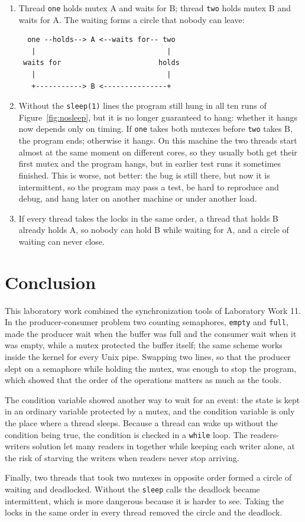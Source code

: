 \documentclass[12pt,a4paper]{article}
\begin{document}
\begin{enumerate}
  \item Thread \texttt{one} holds mutex A and waits for B; thread \texttt{two} holds mutex B and waits for A. The waiting forms a circle that nobody can leave:
\begin{lstlisting}
  one --holds--> A <--waits for-- two
   |                               |
 waits for                       holds
   |                               |
   +-----------> B <---------------+
\end{lstlisting}
  \item Without the \texttt{sleep(1)} lines the program still hung in all ten runs of Figure~\ref{fig:nosleep}, but it is no longer guaranteed to hang: whether it hangs now depends only on timing. If \texttt{one} takes both mutexes before \texttt{two} takes B, the program ends; otherwise it hangs. On this machine the two threads start almost at the same moment on different cores, so they usually both get their first mutex and the program hangs, but in earlier test runs it sometimes finished. This is worse, not better: the bug is still there, but now it is intermittent, so the program may pass a test, be hard to reproduce and debug, and hang later on another machine or under another load.
  \item If every thread takes the locks in the same order, a thread that holds B already holds A, so nobody can hold B while waiting for A, and a circle of waiting can never close.
\end{enumerate}

\newpage
\section*{Conclusion}

This laboratory work combined the synchronization tools of Laboratory Work 11. In the producer-consumer problem two counting semaphores, \texttt{empty} and \texttt{full}, made the producer wait when the buffer was full and the consumer wait when it was empty, while a mutex protected the buffer itself; the same scheme works inside the kernel for every Unix pipe. Swapping two lines, so that the producer slept on a semaphore while holding the mutex, was enough to stop the program, which showed that the order of the operations matters as much as the tools.

The condition variable showed another way to wait for an event: the state is kept in an ordinary variable protected by a mutex, and the condition variable is only the place where a thread sleeps. Because a thread can wake up without the condition being true, the condition is checked in a \texttt{while} loop. The readers-writers solution let many readers in together while keeping each writer alone, at the risk of starving the writers when readers never stop arriving.

Finally, two threads that took two mutexes in opposite order formed a circle of waiting and deadlocked. Without the \texttt{sleep} calls the deadlock became intermittent, which is more dangerous because it is harder to see. Taking the locks in the same order in every thread removed the circle and the deadlock.
\end{document}
